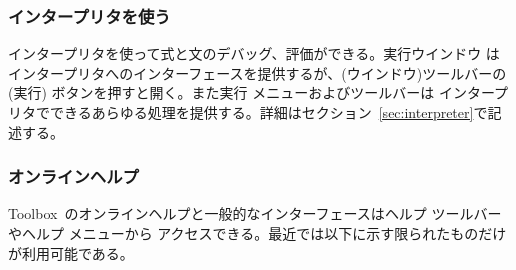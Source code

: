 \documentclass[\pformat,12pt]{jarticle}
\newcommand{\Toolbox}{Toolbox}
\newcommand{\guicmd}[1]{{\gt #1}}
\begin{document}
\subsubsection{インタープリタを使う}


インタープリタを使って式と文のデバッグ、評価ができる。\guicmd{実行ウインドウ}
はインタープリタへのインターフェースを提供するが、(\guicmd{ウインドウ})ツールバーの 
(\guicmd{実行}) ボタンを押すと開く。また\guicmd{実行} メニューおよびツールバーは
インタープリタでできるあらゆる処理を提供する。詳細はセクション~\ref{sec:interpreter}で記述する。

\subsubsection{オンラインヘルプ}
% 
%



\Toolbox\ のオンラインヘルプと一般的なインターフェースは\guicmd{ヘルプ} ツールバーや\guicmd{ヘルプ} メニューから
アクセスできる。最近では以下に示す限られたものだけが利用可能である。
\end{document}
